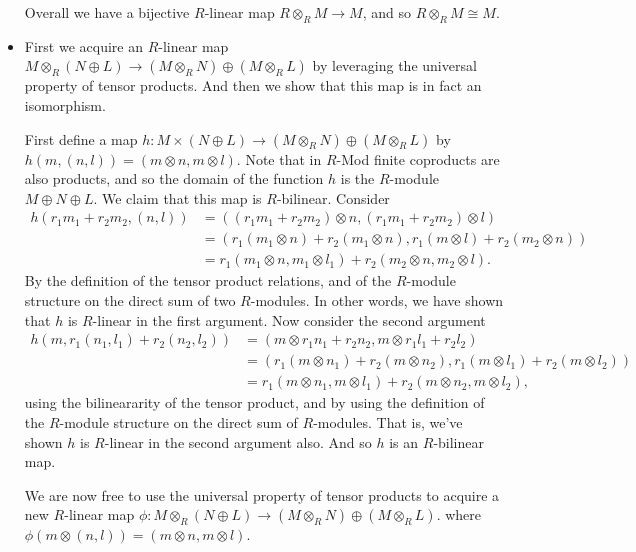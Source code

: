 \documentclass[12pt,letterpaper,boxed]{hmcpset}
\begin{document}
\begin{solution}
\begin{itemize}
Overall we have a bijective $R$-linear map $R \otimes_R M \to M$, and
so $R \otimes_R M \cong M$.

\item 
First we acquire an $R$-linear map $M \otimes_R (N \oplus L) \to (M
\otimes_R N) \oplus (M \otimes_R L)$ by leveraging the universal
property of tensor products. And then we show that this map is in fact
an isomorphism.

First define a map $h: M \times (N \oplus L) \to (M \otimes_R N)
\oplus (M \otimes_R L)$ by $h(m, (n,l)) = (m \otimes n, m \otimes l)$. 
Note that in $R$-Mod finite coproducts are also products, and so the
domain of the function $h$ is the $R$-module $M \oplus N \oplus L$.
We claim that this map is $R$-bilinear. 
Consider
\begin{align*}
	h(r_1 m_1 + r_2 m_2, (n,l)) 
		&= ((r_1m_1 + r_2m_2) \otimes n , (r_1m_1 + r_2 m_2) \otimes l) \\
		&= (r_1(m_1 \otimes n) + r_2 (m_1 \otimes n), r_1(m \otimes l) + r_2(m_2 \otimes n)) \\
		&= r_1(m_1 \otimes n, m_1 \otimes l_1) + r_2(m_2 \otimes n, m_2 \otimes l).
\end{align*}
By the definition of the tensor product relations, and of the
$R$-module structure on the direct sum of two $R$-modules. In other
words, we have shown that $h$ is $R$-linear in the first argument. Now
consider the second argument
\begin{align*}
	h(m, r_1(n_1, l_1) + r_2(n_2, l_2)) 
		&= (m \otimes r_1 n_1 + r_2 n_2, m \otimes r_1 l_1 + r_2 l_2) \\ 
		&= (r_1 (m\otimes n_1) + r_2 (m \otimes n_2), r_1(m \otimes l_1) + r_2(m \otimes l_2)) \\
		&= r_1(m \otimes n_1, m \otimes l_1) + r_2(m \otimes n_2, m \otimes l_2), 
\end{align*}
using the bilineararity of the tensor product, and by using the
definition of the $R$-module structure on the direct sum of
$R$-modules. That is, we've shown $h$ is $R$-linear in the second
argument also. And so $h$ is an $R$-bilinear map.

We are now free to use the universal property of tensor products to
acquire a new $R$-linear map $\phi: M \otimes_R (N \oplus L) \to (M
\otimes_R N) \oplus (M \otimes_R L)$. where $\phi(m \otimes (n,l)) = (m \otimes
n, m \otimes l)$.


\end{itemize}
\end{solution}
\end{document}
